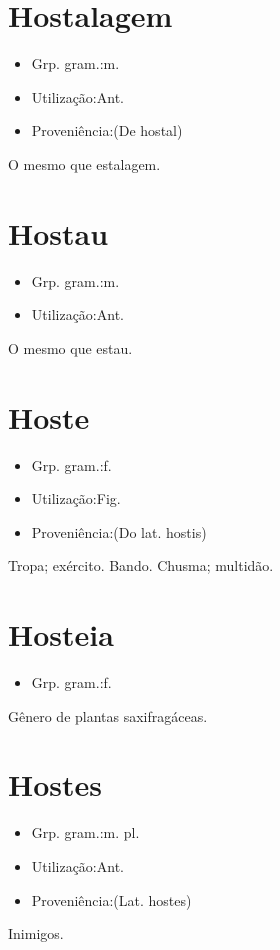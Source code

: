 \documentclass{article}
\begin{document}
\section{Hostalagem}
\begin{itemize}
\item {Grp. gram.:m.}
\end{itemize}
\begin{itemize}
\item {Utilização:Ant.}
\end{itemize}
\begin{itemize}
\item {Proveniência:(De \textunderscore hostal\textunderscore )}
\end{itemize}
O mesmo que \textunderscore estalagem\textunderscore .
\section{Hostau}
\begin{itemize}
\item {Grp. gram.:m.}
\end{itemize}
\begin{itemize}
\item {Utilização:Ant.}
\end{itemize}
O mesmo que \textunderscore estau\textunderscore .
\section{Hoste}
\begin{itemize}
\item {Grp. gram.:f.}
\end{itemize}
\begin{itemize}
\item {Utilização:Fig.}
\end{itemize}
\begin{itemize}
\item {Proveniência:(Do lat. \textunderscore hostis\textunderscore )}
\end{itemize}
Tropa; exército.
Bando.
Chusma; multidão.
\section{Hosteia}
\begin{itemize}
\item {Grp. gram.:f.}
\end{itemize}
Gênero de plantas saxifragáceas.
\section{Hostes}
\begin{itemize}
\item {Grp. gram.:m. pl.}
\end{itemize}
\begin{itemize}
\item {Utilização:Ant.}
\end{itemize}
\begin{itemize}
\item {Proveniência:(Lat. \textunderscore hostes\textunderscore )}
\end{itemize}
Inimigos.
\end{document}
